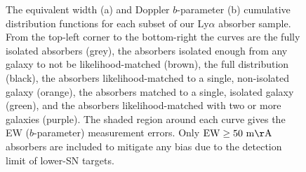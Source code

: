 \documentclass[twocolumn,tighten]{aastex62}
\begin{document}
\begin{figure}[ht!]
        \centering
        \vspace{15pt}
        
        \caption{\small{The equivalent width (a) and Doppler $b$-parameter (b) cumulative distribution functions for each subset of our Ly$\alpha$ absorber sample. From the top-left corner to the bottom-right the curves are the fully isolated absorbers (grey), the absorbers isolated enough from any galaxy to not be likelihood-matched (brown), the full distribution (black), the absorbers likelihood-matched to a single, non-isolated galaxy (orange), the absorbers matched to a single, isolated galaxy (green), and the absorbers likelihood-matched with two or more galaxies (purple). The shaded region around each curve gives the EW ($b$-parameter) measurement errors. Only $\rm EW \ge 50~m\AA$ absorbers are included to mitigate any bias due to the detection limit of lower-SN targets.}}
        \vspace{5pt}
        \label{ew_both}
\end{figure}
\end{document}
